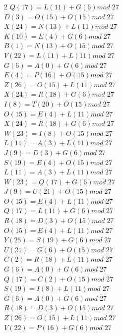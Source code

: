 \documentclass{article}
\begin{document}
\begin{enumerate}
\begin{multicols}{2}
$Q (17) = L(11) + G (6) mod \; 27$ \\
$D (3) = O(15) + O (15) mod \; 27$ \\
$X (24) = N(13) + L (11) mod \; 27$ \\
$K (10) = E(4) + G (6) mod \; 27$ \\
$B (1) = N(13) + O (15) mod \; 27$ \\
$V (22) = L(11) + L (11) mod \; 27$ \\
$G (6) = A(0) + G (6) mod \; 27$ \\
$E (4) = P(16) + O (15) mod \; 27$ \\
$Z (26) = O(15) + L (11) mod \; 27$ \\
$X (24) = R(18) + G (6) mod \; 27$ \\
$I (8) = T(20) + O (15) mod \; 27$ \\
$O (15) = E(4) + L (11) mod \; 27$ \\
$X (24) = R(18) + G (6) mod \; 27$ \\
$W (23) = I(8) + O (15) mod \; 27$ \\
$L (11) = A(3) + L (11) mod \; 27$ \\
$J (9) = D(3) + G (6) mod \; 27$ \\
$S (19) = E(4) + O (15) mod \; 27$ \\
$L (11) = A(3) + L (11) mod \; 27$ \\
$W (23) = Q(17) + G (6) mod \; 27$ \\
$J (9) = U(21) + O (15) mod \; 27$ \\
$O (15) = E(4) + L (11) mod \; 27$ \\
$Q (17) = L(11) + G (6) mod \; 27$ \\
$R (18) = D(3) + O (15) mod \; 27$ \\
$O (15) = E(4) + L (11) mod \; 27$ \\
$Y (25) = S(19) + G (6) mod \; 27$ \\
$U (21) = G(6) + O (15) mod \; 27$ \\
$C (2) = R(18) + L (11) mod \; 27$ \\
$G (6) = A(0) + G (6) mod \; 27$ \\
$Q (17) = C(2) + O (15) mod \; 27$ \\
$S (19) = I(8) + L (11) mod \; 27$ \\
$G (6) = A(0) + G (6) mod \; 27$ \\
$R (18) = D(3) + O (15) mod \; 27$ \\
$Z (26) = O(15) + L (11) mod \; 27$ \\
$V (22) = P(16) + G (6) mod \; 27$ \\

\end{multicols}
\end{enumerate}
\end{document}
